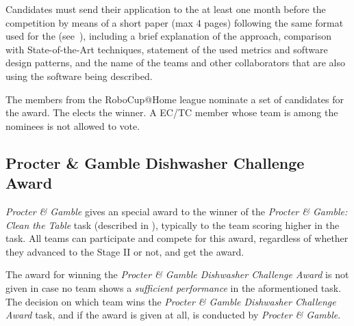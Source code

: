 Candidates must send their application to the  at least one month before the competition by means of a short paper (max 4 pages) following the same format used for the  (see~), including a brief explanation of the approach, comparison with State-of-the-Art techniques, statement of the used metrics and software design patterns, and the name of the teams and other collaborators that are also using the software being described.

The  members from the RoboCup@Home league nominate a set of candidates for the award. The  elects the winner. A EC/TC member whose team is among the nominees is not allowed to vote.


\subsection{Procter \& Gamble Dishwasher Challenge Award}
\label{award:pandg}
\textit{Procter \& Gamble} gives an special award to the winner of the \textit{Procter \& Gamble: Clean the Table} task (described in ), typically to the team scoring higher in the task.
All teams can participate and compete for this award, regardless of whether they advanced to the Stage II or not, and get the award.

The award for winning the \textit{Procter \& Gamble Dishwasher Challenge Award} is not given in case no team shows a \emph{sufficient performance} in the aformentioned task. The decision on which team wins the \textit{Procter \& Gamble Dishwasher Challenge Award} task, and if the award is given at all, is conducted by \textit{Procter \& Gamble}.
